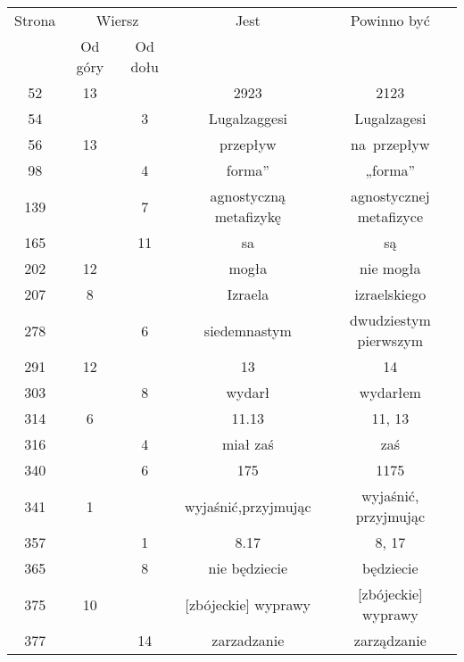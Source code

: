 \documentclass[a4paper,11pt]{article}
\begin{document}
\begin{center}

  \begin{tabular}{|c|c|c|c|c|}
    \hline
    Strona & \multicolumn{2}{c|}{Wiersz} & Jest
                              & Powinno być \\ \cline{2-3}
    & Od góry & Od dołu & & \\
    \hline
    52  & 13 & & 2923 & 2123 \\
    54  & &  3 & Lugalzaggesi & Lugalzagesi \\
    56  & 13 & & przepływ & na~przepływ \\
    98  & &  4 & forma” & „forma” \\
    139 & &  7 & agnostyczną metafizykę & agnostycznej metafizyce \\
    165 & & 11 & sa & są \\
    202 & 12 & & mogła & nie mogła \\
    207 &  8 & & Izraela & izraelskiego \\
    278 & &  6 & siedemnastym & dwudziestym pierwszym \\
    291 & 12 & & 13 & 14 \\
    303 & &  8 & wydarł & wydarłem \\
    314 &  6 & & 11.13 & 11, 13 \\
    316 & &  4 & miał zaś & zaś \\
    340 & &  6 & 175 & 1175 \\
    341 &  1 & & wyjaśnić,przyjmując & wyjaśnić, przyjmując \\
    357 & &  1 & 8.17 & 8, 17 \\
    365 & &  8 & nie będziecie & będziecie \\
    375 & 10 & & [zbójeckie]{ } wyprawy & [zbójeckie] wyprawy \\
    377 & & 14 & zarzadzanie & zarządzanie \\
    \hline
  \end{tabular}

\end{center}

\vspace{\spaceTwo}



\end{document}
